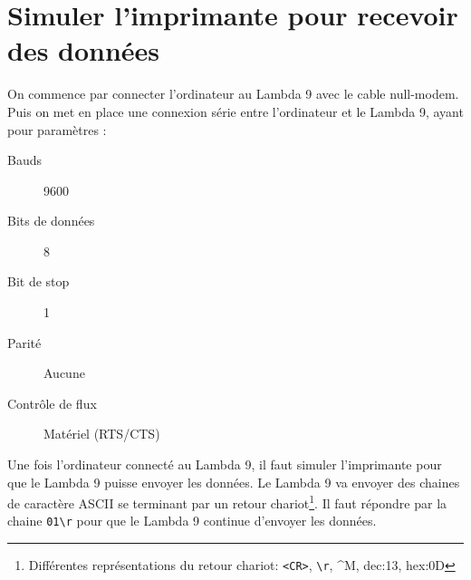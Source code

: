 \documentclass[a4paper, 12pt]{article}
\begin{document}

\newpage
\section{Simuler l'imprimante pour recevoir des données}\label{simuler}


On commence par connecter l'ordinateur au Lambda 9 avec le cable null-modem.
Puis on met en place une connexion série entre l'ordinateur et le Lambda 9, ayant pour paramètres :
\begin{description}
	\item[Bauds] 9600 
	\item[Bits de données] 8 
	\item[Bit de stop] 1 
	\item[Parité] Aucune
	\item[Contrôle de flux] Matériel (RTS/CTS)
\end{description}


Une fois l'ordinateur connecté au Lambda 9, il faut simuler l'imprimante pour que le Lambda 9 puisse envoyer les données.
Le Lambda 9 va envoyer des chaines de caractère ASCII se terminant par un retour chariot\footnote{Différentes représentations du retour chariot: \texttt{<CR>},  \texttt{\textbackslash r}, \^{}M, dec:13, hex:0D}.
Il faut répondre par la chaine \verb|01\r| pour que le Lambda 9 continue d'envoyer les données.
\end{document}
